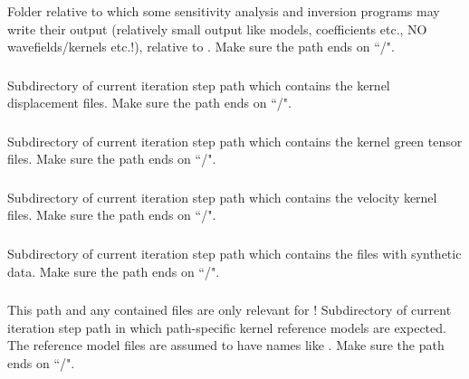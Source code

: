 \subsubsection{}
Folder relative to which some sensitivity analysis and inversion programs may write their output (relatively small output
like models, coefficients etc., NO wavefields/kernels etc.!), relative to 
.  Make sure the path ends on ``/".
\subsubsection{} 
Subdirectory of current iteration step path
 which contains the 
kernel displacement files. Make sure the path ends on ``/".
\subsubsection{} 
Subdirectory of current iteration step path
 which contains the 
kernel green tensor files. Make sure the path ends on ``/".
\subsubsection{} 
Subdirectory of current iteration step path
 which contains the 
velocity kernel files. Make sure the path ends on ``/".
\subsubsection{} 
Subdirectory of current iteration step path
 which contains the 
files with synthetic data. Make sure the path ends on ``/".
\subsubsection{} 
This path and any contained files are only relevant for !
Subdirectory of current iteration step path
 in which path-specific kernel reference models are expected.
The reference model files are assumed to have names like .
Make sure the path ends on ``/".

